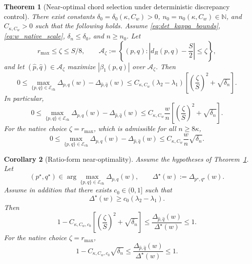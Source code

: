 \documentclass[11pt]{article}
\numberwithin{equation}{section}
\newtheorem{theorem}{Theorem}[section]
\newtheorem{corollary}[theorem]{Corollary}
\theoremstyle{definition}
\theoremstyle{remark}
\begin{document}
\begin{theorem}[Near-optimal chord selection under deterministic discrepancy control]\label{thm:main_optimal_disc}
	There exist constants $\delta_0=\delta_0(\kappa,C_w)>0$,
	$n_0=n_0(\kappa,C_w)\in\mathbb{N}$, and $C_{\kappa,C_w}>0$ such that
	the following holds. Assume \eqref{eq:det_kappa_bounds},
	\eqref{eq:w_native_scale}, $\delta_n\le \delta_0$, and $n\ge n_0$.
	Let
	\[
	r_{\max}\le \zeta\le S/8,
	\qquad
	\mathcal A_\zeta:=
	\left\{
	(p,q):\left|d_R(p,q)-\frac S2\right|\le \zeta
	\right\},
	\]
	and let $(\widehat p,\widehat q)\in\mathcal A_\zeta$ maximize
	$|\beta_1(p,q)|$ over $\mathcal A_\zeta$. Then
	\begin{equation}\label{eq:main_optimal_disc_gamma}
		0\le
		\max_{\{p,q\}\in\mathcal{E}_{\mathrm{ch}}}\Delta_{p,q}(w)-\Delta_{\widehat p,\widehat q}(w)
		\le
		C_{\kappa,C_w}(\lambda_2-\lambda_1)
		\left[
		\left(\frac{\zeta}{S}\right)^2+\sqrt{\delta_n}
		\right].
	\end{equation}
	In particular,
	\begin{equation}\label{eq:main_optimal_disc_additive}
		0\le
		\max_{\{p,q\}\in\mathcal{E}_{\mathrm{ch}}}\Delta_{p,q}(w)-\Delta_{\widehat p,\widehat q}(w)
		\le
		C_{\kappa,C_w}\frac{w}{n}
		\left[
		\left(\frac{\zeta}{S}\right)^2+\sqrt{\delta_n}
		\right].
	\end{equation}
	For the native choice $\zeta=r_{\max}$, which is admissible for all
	$n\ge 8\kappa$,
	\begin{equation}\label{eq:main_optimal_disc_additive_native}
		0\le
		\max_{\{p,q\}\in\mathcal{E}_{\mathrm{ch}}}\Delta_{p,q}(w)-\Delta_{\widehat p,\widehat q}(w)
		\le
		C_{\kappa,C_w}\frac{w}{n}\sqrt{\delta_n}.
	\end{equation}
\end{theorem}



\begin{corollary}[Ratio-form near-optimality]\label{cor:main_optimal_disc_ratio}
	Assume the hypotheses of Theorem~\ref{thm:main_optimal_disc}. Let
	\[
	(p^\star,q^\star)\in\arg\max_{\{p,q\}\in\mathcal{E}_{\mathrm{ch}}}\Delta_{p,q}(w),
	\qquad
	\Delta^\star(w):=\Delta_{p^\star,q^\star}(w).
	\]
	Assume in addition that there exists $c_0\in(0,1]$ such that
	\begin{equation}\label{eq:ratio_nondegenerate}
		\Delta^\star(w)\ge c_0(\lambda_2-\lambda_1).
	\end{equation}
	Then
	\begin{equation}\label{eq:main_optimal_disc_ratio}
		1-C_{\kappa,C_w,c_0}
		\left[
		\left(\frac{\zeta}{S}\right)^2+\sqrt{\delta_n}
		\right]
		\le
		\frac{\Delta_{\widehat p,\widehat q}(w)}{\Delta^\star(w)}
		\le 1.
	\end{equation}
	For the native choice $\zeta=r_{\max}$,
	\begin{equation}\label{eq:main_optimal_disc_ratio_native}
		1-C_{\kappa,C_w,c_0}\sqrt{\delta_n}
		\le
		\frac{\Delta_{\widehat p,\widehat q}(w)}{\Delta^\star(w)}
		\le 1.
	\end{equation}
\end{corollary}
\end{document}
